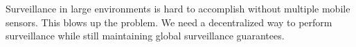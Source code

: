 
Surveillance in large environments is hard to accomplish without multiple mobile sensors. This blows up the problem. We need a decentralized way to perform surveillance while still maintaining global surveillance guarantees. 
